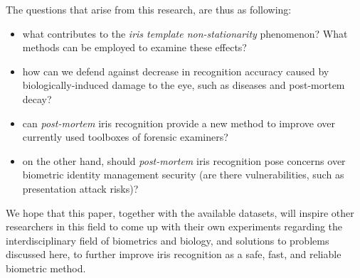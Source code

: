\documentclass[a4paper,twoside]{article}
\begin{document}
The questions that arise from this research, are thus as following:
\begin{itemize}
	\item what contributes to the \emph{iris template non-stationarity} phenomenon? What methods can be employed to examine these effects?
	\item how can we defend against decrease in recognition accuracy caused by biologically-induced damage to the eye, such as diseases and post-mortem decay?
	\item can \emph{post-mortem} iris recognition provide a new method to improve over currently used toolboxes of forensic examiners?
	\item on the other hand, should \emph{post-mortem} iris recognition pose concerns over biometric identity management security (are there vulnerabilities, such as presentation attack risks)?
\end{itemize}

We hope that this paper, together with the available datasets, will inspire other researchers in this field to come up with their own experiments regarding the interdisciplinary field of biometrics and biology, and solutions to problems discussed here, to further improve iris recognition as a safe, fast, and reliable biometric method. 



{\small
}
\end{document}
